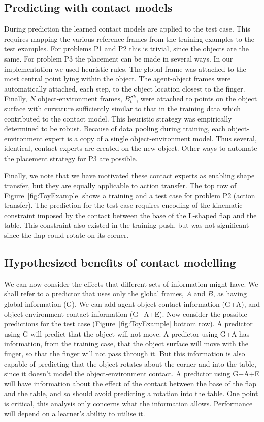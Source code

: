\subsection{Predicting with contact models}
During prediction the learned contact models are applied to the test case. This requires mapping the various reference frames from the training examples to the test examples. For problems P1 and P2 this is trivial, since the objects are the same. For problem P3 the placement can be made in several ways. In our implementation we used heuristic rules. The global frame was attached to the most central point lying within the object. The agent-object frames were automatically attached, each step, to the object location closest to the finger. Finally, $N$ object-environment frames, $B^{Sk}_t$, were attached to points on the object surface with curvature sufficiently similar to that in the training data which contributed to the contact model. This heuristic strategy was empirically determined to be robust. Because of data pooling during training, each object-environment expert is a copy of a single object-environment model. Thus several, identical, contact experts are created on the new object. Other ways to automate the placement strategy for P3 are possible. 

Finally, we note that we have motivated these contact experts as enabling shape transfer, but they are equally applicable to action transfer. The top row of Figure~\ref{fig:ToyExample} shows a training and a test case for problem P2 (action transfer). The prediction for the test case requires encoding of the kinematic constraint imposed by the contact between the base of the L-shaped flap and the table. This constraint also existed in the training push, but was not significant since the flap could rotate on its corner.

\subsection{Hypothesized benefits of contact modelling}
We can now consider the effects that different sets of information might have. We shall refer to a predictor that uses only the global frames, $A$ and $B$, as having global information (G). We can add agent-object contact information (G+A), and object-environment contact information (G+A+E). Now consider the possible predictions for the test case (Figure~\ref{fig:ToyExample} bottom row). A predictor using G will predict that the object will not move. A predictor using G+A has information, from the training case, that the object surface will move with the finger, so that the finger will not pass through it. But this information is also capable of predicting that the object rotates about the corner and into the table, since it doesn't model the object-environment contact. A predictor using G+A+E will have information about the effect of the contact between the base of the flap and the table, and so should avoid predicting a rotation into the table.
One point is critical, this analysis only concerns what the information allows. Performance will depend on a learner's ability to utilise it.  

